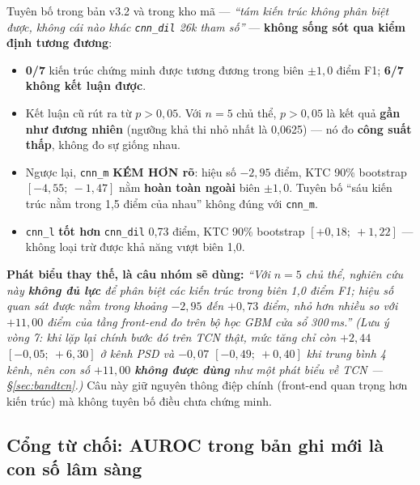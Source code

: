 \begin{canhbao}[title={Đây là đảo chiều lớn nhất của toàn bộ đợt rà soát}]
Tuyên bố trong bản v3.2 và trong kho mã --- \textit{``tám kiến trúc không phân biệt được, không cái nào
khác \texttt{cnn\_dil} 26k tham số''} --- \textbf{không sống sót qua kiểm định tương đương}:

\begin{itemize}[leftmargin=1.5em,itemsep=3pt]
\item \textbf{0/7} kiến trúc chứng minh được tương đương trong biên $\pm1{,}0$ điểm F1;
\textbf{6/7} \textbf{không kết luận được}.
\item Kết luận cũ rút ra từ $p > 0{,}05$. Với $n = 5$ chủ thể, $p > 0{,}05$ là kết quả \textbf{gần như
đương nhiên} (ngưỡng khả thi nhỏ nhất là 0,0625) --- nó đo \textbf{công suất thấp}, không đo sự giống nhau.
\item Ngược lại, \texttt{cnn\_m} \textbf{KÉM HƠN rõ}: hiệu số $-2{,}95$ điểm, KTC 90\% bootstrap
$[-4{,}55;\ -1{,}47]$ nằm \textbf{hoàn toàn ngoài} biên $\pm1{,}0$. Tuyên bố ``sáu kiến trúc nằm trong
1,5 điểm của nhau'' không đúng với \texttt{cnn\_m}.
\item \texttt{cnn\_l} \textbf{tốt hơn} \texttt{cnn\_dil} 0,73 điểm, KTC 90\% bootstrap
$[+0{,}18;\ +1{,}22]$ --- không loại trừ được khả năng vượt biên 1,0.
\end{itemize}

\textbf{Phát biểu thay thế, là câu nhóm sẽ dùng:} \textit{``Với $n = 5$ chủ thể, nghiên cứu này
\textbf{không đủ lực} để phân biệt các kiến trúc trong biên 1,0 điểm F1; hiệu số quan sát được nằm trong
khoảng $-2{,}95$ đến $+0{,}73$ điểm, nhỏ hơn nhiều so với $+11{,}00$ điểm của tầng front-end \emph{đo
trên bộ học GBM cửa sổ 300\,ms}.''} \textit{(Lưu ý vòng 7: khi lặp lại chính bước đó trên TCN thật,
mức tăng chỉ còn $+2{,}44$ $[-0{,}05;\ +6{,}30]$ ở kênh PSD và $-0{,}07$ $[-0{,}49;\ +0{,}40]$ khi
trung bình 4 kênh, nên con số $+11{,}00$ \textbf{không được dùng} như một phát biểu về TCN ---
\S\ref{sec:bandtcn}.)}
Câu này giữ nguyên thông điệp chính (front-end quan trọng hơn kiến trúc) mà không tuyên bố điều chưa
chứng minh.
\end{canhbao}

\subsection{Cổng từ chối: AUROC trong bản ghi mới là con số lâm sàng}

